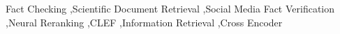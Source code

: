 \documentclass{ceurart}
\begin{document}
  \begin{keywords}
    Fact Checking \sep Scientific Document Retrieval \sep Social Media Fact Verification \sep Neural Reranking \sep CLEF \sep Information Retrieval \sep Cross Encoder

  \end{keywords}

  \maketitle

  

  

  

  

  

  

  

  
\end{document}
